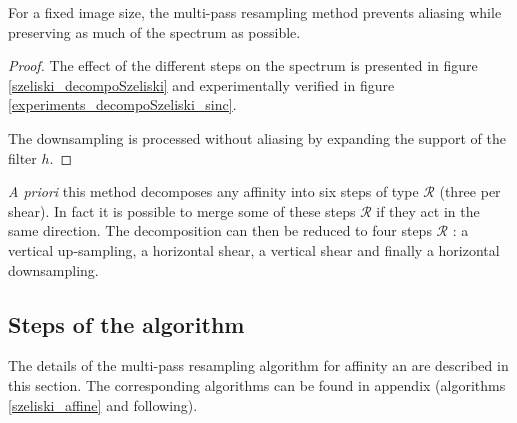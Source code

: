 	\begin{prop}
	For a fixed image size, the multi-pass resampling method \cite{szeliski2010high} prevents aliasing while preserving as much of the spectrum as possible. %
	\end{prop}
	\begin{proof}
	The effect of the different steps on the spectrum is presented in figure \ref{szeliski_decompoSzeliski} and experimentally verified in figure \ref{experiments_decompoSzeliski_sinc}.
	
\noindent	The downsampling is processed without aliasing by expanding the support of the filter $h$.
	\end{proof}
	
	


	\emph{A priori} this method decomposes any affinity into six steps of type $\mathcal R$ (three per shear). In fact it is possible to merge some of these steps $\mathcal R$ if they act in the same direction. The decomposition can then be reduced to four steps $\mathcal R$ : a vertical up-sampling, a horizontal shear, a vertical shear and finally a horizontal downsampling.
	
	
\subsection{Steps of the algorithm}
	\label{szeliski_affine_section}
	
	The details of the multi-pass resampling algorithm for affinity an are described in this section. The corresponding algorithms can be found in appendix (algorithms \ref{szeliski_affine} and following).
	
